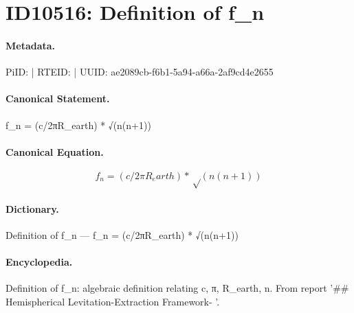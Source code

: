 \section*{ID10516: Definition of f\_n}
\paragraph{Metadata.}
PiID:  | RTEID:  | UUID: ae2089cb-f6b1-5a94-a66a-2af9cd4e2655

\paragraph{Canonical Statement.}
f\_n = (c/2πR\_earth) * √(n(n+1))

\paragraph{Canonical Equation.}
\[
f_n = (c/2πR_earth) * √(n(n+1))
\]

\paragraph{Dictionary.}
Definition of f\_n — f\_n = (c/2πR\_earth) * √(n(n+1))

\paragraph{Encyclopedia.}
Definition of f\_n: algebraic definition relating c, π, R\_earth, n. From report '\#\# Hemispherical Levitation-Extraction Framework- '.
